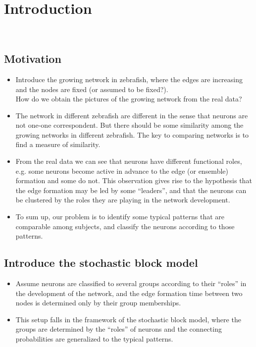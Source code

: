 

\section{Introduction}
~ 

\subsection*{Motivation}
\begin{itemize}
	\item Introduce the growing network in zebrafish, where the edges are increasing and the nodes are fixed (or assumed to be fixed?).\\
	How do we obtain the pictures of the growing network from the real data?
	\item The network in different zebrafish are different in the sense that neurons are not one-one correspondent. 
	But there should be some similarity among the growing networks in different zebrafish. 
	The key to comparing networks is to find a measure of similarity.
	\item From the real data we can see that neurons have different functional roles, e.g. some neurons become active in advance to the edge (or ensemble) formation and some do not.
	This observation gives rise to the hypothesis that the edge formation may be led by some ``leaders'', and that the neurons can be clustered by the roles they are playing in the network development. 
	\item To sum up, our problem is to identify some typical patterns that are comparable among subjects, and classify the neurons according to those patterns.

\end{itemize}

\subsection*{Introduce the stochastic block model}
	\begin{itemize}
	\item Assume neurons are classified to several groups according to their ``roles'' in the development of the network, and the edge formation time between two nodes is determined only by their group memberships.
	\item This setup falls in the framework of the stochastic block model, where the groups are determined by the ``roles'' of neurons and the connecting probabilities are generalized to the typical patterns.

	\end{itemize}


